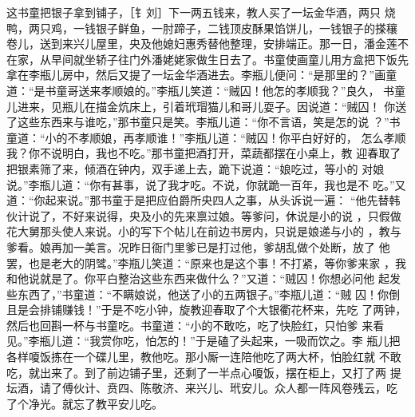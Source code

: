 这书童把银子拿到铺子，［钅刘］下一两五钱来，教人买了一坛金华酒，两只
烧鸭，两只鸡，一钱银子鲜鱼，一肘蹄子，二钱顶皮酥果馅饼儿，一钱银子的搽穰
卷儿，送到来兴儿屋里，央及他媳妇惠秀替他整理，安排端正。那一日，潘金莲不
在家，从早间就坐轿子往门外潘姥姥家做生日去了。书童使画童儿用方盒把下饭先
拿在李瓶儿房中，然后又提了一坛金华酒进去。李瓶儿便问：“是那里的？”画童
道：“是书童哥送来孝顺娘的。”李瓶儿笑道：“贼囚！他怎的孝顺我？”良久，
书童儿进来，见瓶儿在描金炕床上，引着玳瑁猫儿和哥儿耍子。因说道：“贼囚！
你送了这些东西来与谁吃，”那书童只是笑。李瓶儿道：“你不言语，笑是怎的说
？”书童道：“小的不孝顺娘，再孝顺谁！”李瓶儿道：“贼囚！你平白好好的，
怎么孝顺我？你不说明白，我也不吃。”那书童把酒打开，菜蔬都摆在小桌上，教
迎春取了把银素筛了来，倾酒在钟内，双手递上去，跪下说道：“娘吃过，等小的
对娘说。”李瓶儿道：“你有甚事，说了我才吃。不说，你就跪一百年，我也是不
吃。”又道：“你起来说。”那书童于是把应伯爵所央四人之事，从头诉说一遍：
“他先替韩伙计说了，不好来说得，央及小的先来禀过娘。等爹问，休说是小的说
，只假做花大舅那头使人来说。小的写下个帖儿在前边书房内，只说是娘递与小的
，教与爹看。娘再加一美言。况昨日衙门里爹已是打过他，爹胡乱做个处断，放了
他罢，也是老大的阴骘。”李瓶儿笑道：“原来也是这个事！不打紧，等你爹来家
，我和他说就是了。你平白整治这些东西来做什么？”又道：“贼囚！你想必问他
起发些东西了，”书童道：“不瞒娘说，他送了小的五两银子。”李瓶儿道：“贼
囚！你倒且是会排铺赚钱！”于是不吃小钟，旋教迎春取了个大银衢花杯来，先吃
了两钟，然后也回斟一杯与书童吃。书童道：“小的不敢吃，吃了快脸红，只怕爹
来看见。”李瓶儿道：“我赏你吃，怕怎的！”于是磕了头起来，一吸而饮之。李
瓶儿把各样嗄饭拣在一个碟儿里，教他吃。那小厮一连陪他吃了两大杯，怕脸红就
不敢吃，就出来了。到了前边铺子里，还剩了一半点心嗄饭，摆在柜上，又打了两
提坛酒，请了傅伙计、贲四、陈敬济、来兴儿、玳安儿。众人都一阵风卷残云，吃
了个净光。就忘了教平安儿吃。

